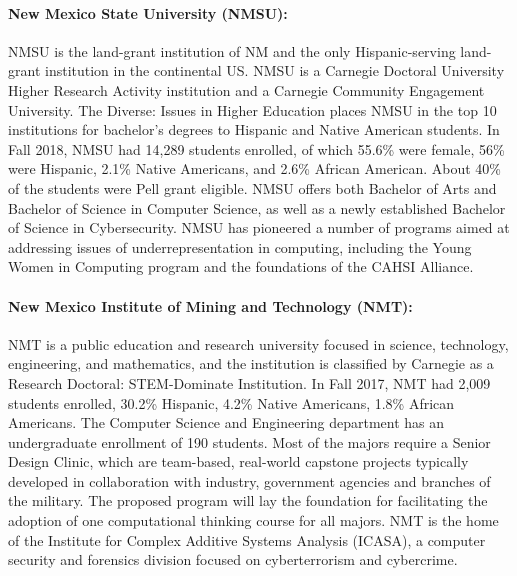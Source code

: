 \paragraph{New Mexico State University (NMSU):}
NMSU is the land-grant institution of NM and the only Hispanic-serving land-grant institution in the continental US. %
NMSU is a Carnegie Doctoral University Higher Research Activity institution
and a Carnegie Community Engagement University.
The Diverse: Issues in Higher Education places NMSU
in the top 10 institutions for bachelor’s degrees to Hispanic and Native American students. 
In Fall 2018, NMSU had 14,289 students enrolled, of which 55.6\% were female, 56\% were Hispanic, 2.1\%
Native Americans, and 2.6\% African American. About 40\% of the students were Pell grant eligible.
NMSU offers both Bachelor of Arts and Bachelor of Science in Computer Science, as well as a newly established Bachelor of Science in Cybersecurity.  NMSU has pioneered a number of programs aimed at addressing issues of underrepresentation in computing, including the Young Women in Computing program and the foundations of the CAHSI Alliance.

\paragraph{New Mexico Institute of Mining and Technology (NMT):}
NMT is a public education and research university focused in science, technology, engineering, and mathematics, and the institution is classified by Carnegie as a Research Doctoral: STEM-Dominate Institution. 
In Fall
2017, NMT had 2,009 students enrolled, 30.2\% Hispanic, 4.2\% Native Americans, 1.8\% African Americans.
The Computer Science and Engineering department has an undergraduate enrollment of 190 students.
Most of the majors require a Senior Design Clinic, which are team-based,
real-world capstone projects typically developed in collaboration with industry, government agencies
and branches of the military. The proposed program will lay the foundation for facilitating the adoption of one computational thinking course for all majors. NMT is the home of the Institute for Complex Additive Systems Analysis (ICASA), a computer security and forensics division focused on cyberterrorism and cybercrime.


